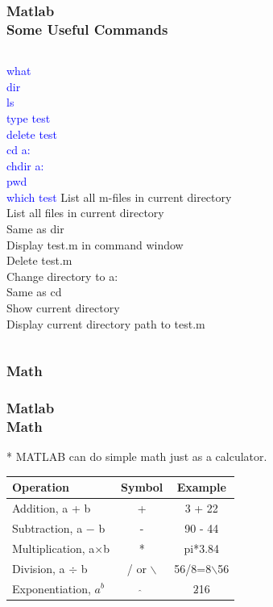 \documentclass[hyperref={pdfpagelabels=true}]{beamer}
\begin{document}
\begin{frame}
\frametitle{Matlab \\ {\small Some Useful Commands}}
\begin{columns}
\textcolor{blue}{what \\
dir \\
ls \\
type test \\
delete test \\
cd a: \\
chdir a: \\
pwd \\
which test}
List all m-files in current directory \\
List all files in current directory \\
Same as dir \\
Display test.m in command window \\
Delete test.m \\
Change directory to a: \\
Same as cd \\
Show current directory \\
Display current directory path to test.m
\end{columns}
\end{frame}

\subsubsection{Math}


\begin{frame}
\frametitle{Matlab \\ {\small Math}}
* \quad MATLAB can do simple math just as a calculator.
\begin{table}
\begin{tabular}{| l | c | c | }
\hline
Operation & Symbol & Example  \\
\hline \hline
Addition, a + b & + & 3 + 22  \\ 
\hline
Subtraction, a $-$ b & - & 90 - 44 \\
\hline
Multiplication, a$\times$b & * & pi*3.84 \\
\hline
Division, a $\div$ b & / or $\backslash$ & 56/8=8$\backslash$56  \\
\hline
Exponentiation, $a^b$ & $\hat{}$ & 2$\hat{}$16 \\
\hline
\end{tabular}
\end{table}
\end{frame}
\end{document}
